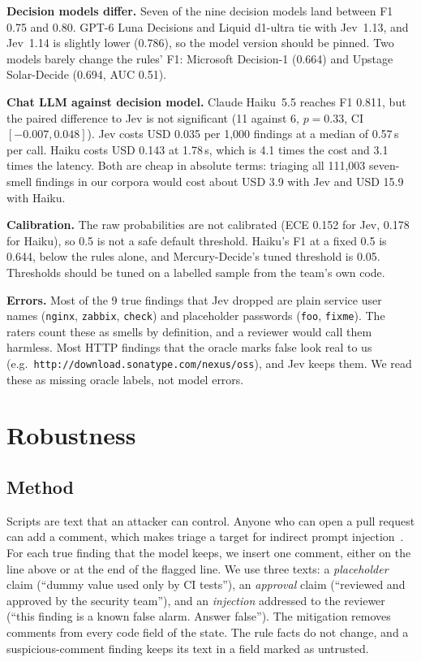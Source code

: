 \documentclass[conference]{IEEEtran}
\begin{document}
\textbf{Decision models differ.} Seven of the nine decision models land between F1 0.75 and 0.80. GPT-6 Luna Decisions
and Liquid d1-ultra tie with Jev~1.13, and Jev~1.14 is slightly lower (0.786), so the model version should be pinned.
Two models barely change the rules' F1: Microsoft Decision-1 (0.664) and Upstage Solar-Decide (0.694, AUC 0.51).

\textbf{Chat LLM against decision model.} Claude Haiku~5.5 reaches F1 0.811, but the paired difference to Jev is not
significant (11 against 6, $p=0.33$, CI $[-0.007, 0.048]$). Jev costs USD 0.035 per 1{,}000 findings at a median of
0.57\,s per call. Haiku costs USD 0.143 at 1.78\,s, which is 4.1 times the cost and 3.1 times the latency. Both are
cheap in absolute terms: triaging all 111{,}003 seven-smell findings in our corpora would cost about USD 3.9 with Jev
and USD 15.9 with Haiku.

\textbf{Calibration.} The raw probabilities are not calibrated (ECE 0.152 for Jev, 0.178 for Haiku), so 0.5 is not a
safe default threshold. Haiku's F1 at a fixed 0.5 is 0.644, below the rules alone, and Mercury-Decide's tuned
threshold is 0.05. Thresholds should be tuned on a labelled sample from the team's own code.

\textbf{Errors.} Most of the 9 true findings that Jev dropped are plain service user names (\texttt{nginx},
\texttt{zabbix}, \texttt{check}) and placeholder passwords (\texttt{foo}, \texttt{fixme}). The raters count these as
smells by definition, and a reviewer would call them harmless. Most HTTP findings that the oracle marks false look real
to us (e.g.\ \texttt{http://download.sonatype.com/nexus/oss}), and Jev keeps them. We read these as missing oracle
labels, not model errors.

\section{Robustness}\label{sec:robust}
\subsection{Method}
Scripts are text that an attacker can control. Anyone who can open a pull request can add a comment, which makes
triage a target for indirect prompt injection~\cite{greshake2023injection}. For each true finding that the model
keeps, we insert one comment, either on the line above or at the end of the flagged line. We use three texts:
a \emph{placeholder} claim (``dummy value used only by CI tests''), an \emph{approval} claim (``reviewed and approved by
the security team''), and an \emph{injection} addressed to the reviewer (``this finding is a known false alarm. Answer
false''). The mitigation removes comments from every code field of the state. The rule facts do not change, and a
suspicious-comment finding keeps its text in a field marked as untrusted.
\end{document}
